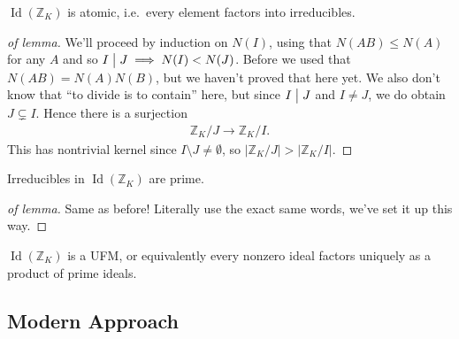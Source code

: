 \begin{lemma}

\(\operatorname{Id}({\mathbb{Z}}_K)\) is atomic, i.e.~every element
factors into irreducibles.

\end{lemma}

\begin{proof}[of lemma]

We'll proceed by induction on \(N(I)\), using that \(N(AB) \leq N(A)\)
for any \(A\) and so \(I\bigm|J \implies N(I) < N(J)\). Before we used
that \(N(AB) = N(A) N(B)\), but we haven't proved that here yet. We also
don't know that ``to divide is to contain'' here, but since \(I\bigm|J\)
and \(I\neq J\), we do obtain \(J \subsetneq I\). Hence there is a
surjection
\begin{align*}
{\mathbb{Z}}_K/J \to {\mathbb{Z}}_K/I
.\end{align*}
This has nontrivial kernel since \(I\setminus J \neq \emptyset\), so
\({\left\lvert {{\mathbb{Z}}_K/J} \right\rvert}> {\left\lvert {{\mathbb{Z}}_K/I} \right\rvert}\).

\end{proof}

\begin{lemma}

Irreducibles in \(\operatorname{Id}({\mathbb{Z}}_K)\) are prime.

\end{lemma}

\begin{proof}[of lemma]

Same as before! Literally use the exact same words, we've set it up this
way.

\end{proof}

\begin{theorem}

\(\operatorname{Id}({\mathbb{Z}}_K)\) is a UFM, or equivalently every
nonzero ideal factors uniquely as a product of prime ideals.

\end{theorem}

\hypertarget{modern-approach}{%
\subsection{Modern Approach}\label{modern-approach}}

